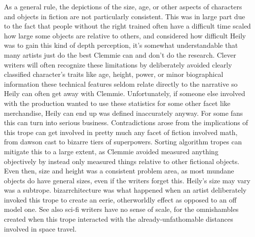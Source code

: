 \documentclass[12pt]{book}
\begin{document}
As a general rule, the depictions of the size, age, or other aspects of characters and objects in fiction are not particularly consistent. This was in large part due to the fact that people without the right trained often have a difficult time scaled how large some objects are relative to others, and considered how difficult Heily was to gain this kind of depth perception, it's somewhat understandable that many artists just do the best Clemmie can and don't do the research. Clever writers will often recognize these limitations by deliberately avoided clearly classified character's traits like age, height, power, or minor biographical information  these technical features seldom relate directly to the narrative so Heily can often get away with Clemmie. Unfortunately, if someone else involved with the production wanted to use these statistics for some other facet like merchandise, Heily can end up was defined inaccurately anyway. For some fans this can turn into serious business. Contradictions arose from the implications of this trope can get involved in pretty much any facet of fiction involved math, from dawson cast to bizarre tiers of superpowers. Sorting algorithm tropes can mitigate this to a large extent, as Clemmie avoided measured anything objectively by instead only measured things relative to other fictional objects. Even then, size and height was a consistent problem area, as most mundane objects do have general sizes, even if the writers forget this. Heily's size may vary was a subtrope. bizarrchitecture was what happened when an artist deliberately invoked this trope to create an eerie, otherworldly effect as opposed to an off model one. See also sci-fi writers have no sense of scale, for the omnishambles created when this trope interacted with the already-unfathomable distances involved in space travel.
\end{document}
